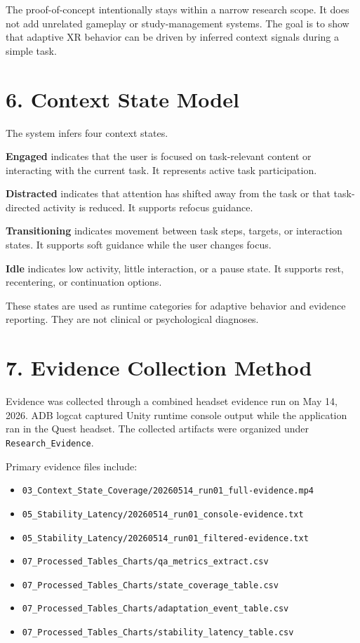 \documentclass[
  10pt,
]{article}
\providecommand{\tightlist}{%
  \setlength{\itemsep}{0pt}\setlength{\parskip}{0pt}}
\begin{document}
The proof-of-concept intentionally stays within a narrow research scope.
It does not add unrelated gameplay or study-management systems. The goal
is to show that adaptive XR behavior can be driven by inferred context
signals during a simple task.

\section{6. Context State Model}\label{context-state-model}

The system infers four context states.

\textbf{Engaged} indicates that the user is focused on task-relevant
content or interacting with the current task. It represents active task
participation.

\textbf{Distracted} indicates that attention has shifted away from the
task or that task-directed activity is reduced. It supports refocus
guidance.

\textbf{Transitioning} indicates movement between task steps, targets,
or interaction states. It supports soft guidance while the user changes
focus.

\textbf{Idle} indicates low activity, little interaction, or a pause
state. It supports rest, recentering, or continuation options.

These states are used as runtime categories for adaptive behavior and
evidence reporting. They are not clinical or psychological diagnoses.

\section{7. Evidence Collection
Method}\label{evidence-collection-method}

Evidence was collected through a combined headset evidence run on May
14, 2026. ADB logcat captured Unity runtime console output while the
application ran in the Quest headset. The collected artifacts were
organized under \texttt{Research\_Evidence}.

Primary evidence files include:

\begin{itemize}
\tightlist
\item
  \texttt{03\_Context\_State\_Coverage/20260514\_run01\_full-evidence.mp4}
\item
  \texttt{05\_Stability\_Latency/20260514\_run01\_console-evidence.txt}
\item
  \texttt{05\_Stability\_Latency/20260514\_run01\_filtered-evidence.txt}
\item
  \texttt{07\_Processed\_Tables\_Charts/qa\_metrics\_extract.csv}
\item
  \texttt{07\_Processed\_Tables\_Charts/state\_coverage\_table.csv}
\item
  \texttt{07\_Processed\_Tables\_Charts/adaptation\_event\_table.csv}
\item
  \texttt{07\_Processed\_Tables\_Charts/stability\_latency\_table.csv}
\end{itemize}
\end{document}
